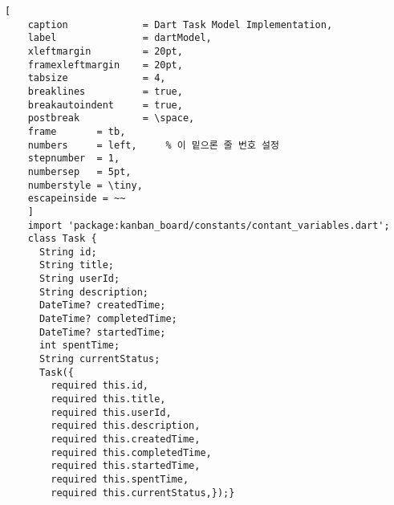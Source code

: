 \begin{lstlisting}[
	caption				= Dart Task Model Implementation,	
	label				= dartModel,         
	xleftmargin			= 20pt,
	framexleftmargin	= 20pt,
	tabsize				= 4,
	breaklines			= true,
	breakautoindent		= true,
	postbreak			= \space,
	frame		= tb,
	numbers		= left,		% 이 밑으론 줄 번호 설정
	stepnumber	= 1,
	numbersep	= 5pt,
	numberstyle	= \tiny,
	escapeinside = ~~
	]
    import 'package:kanban_board/constants/contant_variables.dart';
    class Task {
      String id;
      String title;
      String userId;
      String description;
      DateTime? createdTime;
      DateTime? completedTime;
      DateTime? startedTime;
      int spentTime;
      String currentStatus;
      Task({
        required this.id,
        required this.title,
        required this.userId,
        required this.description,
        required this.createdTime,
        required this.completedTime,
        required this.startedTime,
        required this.spentTime,
        required this.currentStatus,});}
\end{lstlisting}